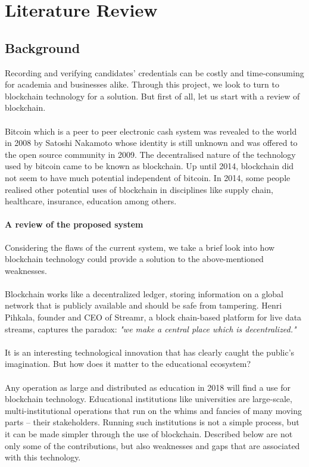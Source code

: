 \chapter{Literature Review}

\section{Background}

Recording and verifying candidates' credentials can be costly and time-consuming for academia and businesses alike. Through this project, we look to turn to blockchain technology for a solution. But first of all, let us start with a review of blockchain.\\~\\

Bitcoin which is a peer to peer electronic cash system was revealed to the world in 2008 by Satoshi Nakamoto whose identity is still unknown and was offered to the open source community in 2009. The decentralised nature of the technology used by bitcoin came to be known as blockchain. 
Up until 2014, blockchain did not seem to have much potential independent of bitcoin. In 2014, some people realised other potential uses of blockchain in disciplines like supply chain, healthcare, insurance, education among others. 


\subsubsection{A review of the proposed system}

Considering the flaws of the current system, we take a brief look into how blockchain technology could provide a solution to the above-mentioned weaknesses. \\ \\
Blockchain works like a decentralized ledger, storing information on a global network that is publicly available and should be safe from tampering. Henri Pihkala, founder and CEO of Streamr, a block chain-based platform for live data streams, captures the paradox: \textit{"we make a central place which is decentralized."} \\ \\
It is an interesting technological innovation that has clearly caught the public’s imagination. But how does it matter to the educational ecosystem?\\ \\ 
Any operation as large and distributed as education in 2018 will find a use for blockchain technology. Educational institutions like universities are large-scale, multi-institutional operations that run on the whims and fancies of many moving parts – their stakeholders. Running such institutions is not a simple process, but it can be made simpler through the use of blockchain. Described below are not only some of the contributions, but also weaknesses and gaps that are associated with this technology.

